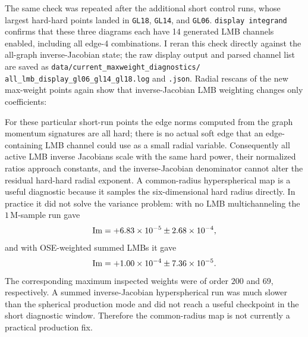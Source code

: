 \documentclass[11pt]{article}
\begin{document}
The same check was repeated after the additional short control runs, whose
largest hard-hard points landed in \texttt{GL18}, \texttt{GL14}, and
\texttt{GL06}.  \texttt{display integrand} confirms that these three diagrams
each have 14 generated LMB channels enabled, including all edge-4 combinations.
I reran this check directly against the all-graph inverse-Jacobian state; the
raw display output and parsed channel list are saved as
\texttt{data/current\_maxweight\_diagnostics/}
\texttt{all\_lmb\_display\_gl06\_gl14\_gl18.log} and \texttt{.json}.
Radial rescans of the new max-weight points again show that inverse-Jacobian
LMB weighting changes only coefficients:
\begin{center}
\scriptsize
{}
\end{center}
For these particular short-run points the edge norms computed from the graph
momentum signatures are all hard; there is no actual soft edge that an
edge-containing LMB channel could use as a small radial variable.  Consequently
all active LMB inverse Jacobians scale with the same hard power, their
normalized ratios approach constants, and the inverse-Jacobian denominator
cannot alter the residual hard-hard radial exponent.  A common-radius
hyperspherical map is a useful diagnostic because it samples the six-dimensional
hard radius directly.  In practice it did not solve the variance problem:
with no LMB multichanneling the \(1\,\mathrm{M}\)-sample run gave
\[
  {\rm Im}=+6.83\times 10^{-5}\pm2.68\times10^{-4},
\]
and with OSE-weighted summed LMBs it gave
\[
  {\rm Im}=+1.00\times 10^{-4}\pm7.36\times10^{-5}.
\]
The corresponding maximum inspected weights were of order \(200\) and \(69\),
respectively.  A summed inverse-Jacobian hyperspherical run was much slower
than the spherical production mode and did not reach a useful checkpoint in the
short diagnostic window.  Therefore the common-radius map is not currently a
practical production fix.
\end{document}
